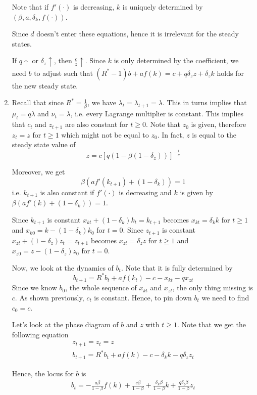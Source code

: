 \documentclass[12pt]{article}
\newcommand{\1}{{\bf 1}} %
\begin{document}
\begin{enumerate}[(1)]
Note that if $f'(\cdot)$ is decreasing, $k$ is uniquely determined by $(\beta,a,\delta_k,f(\cdot))$.

Since $d$ doesn't enter these equations, hence it is irrelevant for the steady states.

If $q\uparrow$ or $\delta_z \uparrow$, then $\frac{c}{z} \uparrow$. Since $k$ is only determined by the coefficient, we need $b$ to adjust such that $(R^*-1)b+af(k)= c+q\delta_zz+\delta_zk$ holds for the new steady state.
	
	\item 
	
	Recall that since $R^*=\frac{1}{\beta}$, we have $\lambda_t = \lambda_{t+1} = \lambda$. This in turns implies that 
	$\mu_t=q\lambda$ and $\nu_t=\lambda$, i.e. every Lagrange multiplier is constant. This implies that $c_t$ and $z_{t+1}$ are also constant for $t\geq 0$. Note that $z_0$ is given, therefore $z_t=z$ for $t\geq 1$ which might not be equal to $z_0$. In fact, $z$ is equal to the steady state value of 
	\[
	z= c[q(1-\beta(1-\delta_z))]^{-\frac{1}{\eta}}
	\]
	
	Moreover, we get
	\[
	\beta(af'(k_{t+1})+(1-\delta_k))=1
	\]
	i.e. $k_{t+1}$ is also constant if $f'(\cdot)$ is decreasing and $k$ is given by $\beta(af'(k)+(1-\delta_k))=1$.
	
	Since $k_{t+1}$ is constant $x_{kt}+(1-\delta_k)k_t= k_{t+1}$ becomes $x_{kt}=\delta_kk$ for $t\geq 1$ and $x_{k0}=k-(1-\delta_k)k_0$ for $t=0$.
	Since $z_{t+1}$ is constant $x_{zt}+(1-\delta_z)z_t= z_{t+1}$ becomes $x_{zt}=\delta_zz$ for $t\geq 1$ and $x_{z0}=z-(1-\delta_z)z_0$ for $t=0$.
	
	Now, we look at the dynamics of $b_t$. Note that it is fully determined by
	\[
	b_{t+1}=R^*b_t+af(k_t)- c-x_{kt}-qx_{zt}
	\]
	Since we know $b_0$, the whole sequence of $x_{kt}$ and $x_{zt}$, the only thing missing is $c$. As shown previously, $c_t$ is constant. Hence, to pin down $b_t$ we need to find $c_0=c$.
	
	Let's look at the phase diagram of $b$ and $z$ with $t\geq 1$. Note that we get the following equation
\begin{align*}
	z_{t+1} = z_t = z\\
	b_{t+1}=R^*b_t+af(k)- c-\delta_k k-q\delta_z z_t
\end{align*}

Hence, the locus for $b$ is
\begin{align*}
	b_{t}=-\frac{a\beta}{1-\beta}f(k)+ \frac{c\beta}{1-\beta}+ \frac{\delta_k\beta}{1-\beta}k+\frac{q\delta_z\beta}{1-\beta} z_t
\end{align*}


\end{enumerate}
\end{document}
